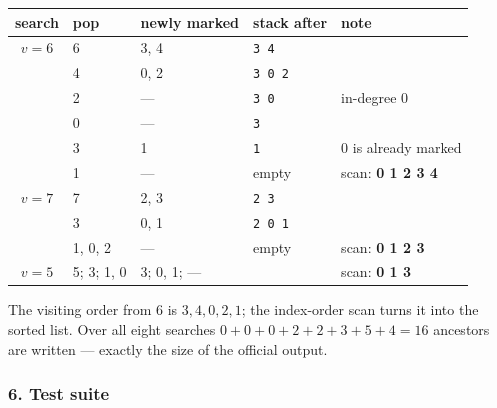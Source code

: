 \begin{tracebox}[{Sample 1, Approach 2: the searches from $v = 6$ and $v = 7$}]
\begin{center}
\begin{tabular}{@{}cllll@{}}
\toprule
\textbf{search} & \textbf{pop} & \textbf{newly marked} & \textbf{stack after} & \textbf{note} \\
\midrule
$v = 6$ & 6 & 3, 4 & \texttt{3 4} & \\
        & 4 & 0, 2 & \texttt{3 0 2} & \\
        & 2 & --- & \texttt{3 0} & in-degree 0 \\
        & 0 & --- & \texttt{3} & \\
        & 3 & 1 & \texttt{1} & 0 is already marked \\
        & 1 & --- & empty & scan: \textbf{0 1 2 3 4} \\
\midrule
$v = 7$ & 7 & 2, 3 & \texttt{2 3} & \\
        & 3 & 0, 1 & \texttt{2 0 1} & \\
        & 1, 0, 2 & --- & empty & scan: \textbf{0 1 2 3} \\
\midrule
$v = 5$ & 5; 3; 1, 0 & 3; 0, 1; --- & & scan: \textbf{0 1 3} \\
\bottomrule
\end{tabular}
\end{center}
The visiting order from 6 is $3, 4, 0, 2, 1$; the index-order scan turns it into the sorted list. Over all eight searches $0+0+0+2+2+3+5+4 = 16$ ancestors are written --- exactly the size of the official output.
\end{tracebox}

\subsubsection*{6. Test suite}

